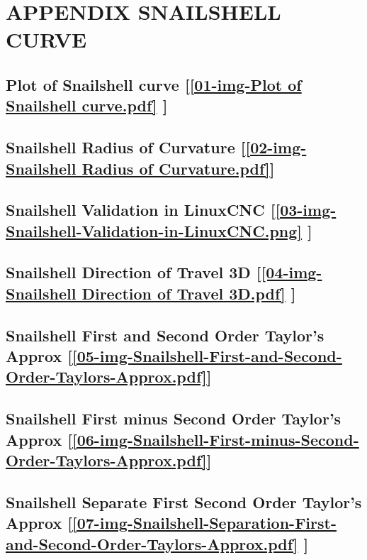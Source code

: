 \section{\textbf{APPENDIX SNAILSHELL CURVE}} \label{APPENDIX SNAILSHELL CURVE}


\subsection       {Plot of Snailshell curve
	[\ref  {01-img-Plot of Snailshell curve.pdf} ] }
\label{ssec-01-img-Plot of Snailshell curve.pdf}

\subsection       {Snailshell Radius of Curvature
	[\ref      {02-img-Snailshell Radius of Curvature.pdf}] }
\label{ssec-02-img-Snailshell Radius of Curvature.pdf}

\subsection       {Snailshell Validation in LinuxCNC
	[\ref      {03-img-Snailshell-Validation-in-LinuxCNC.png} ] }
\label{ssec-03-img-Snailshell-Validation-in-LinuxCNC.png}

\subsection     {Snailshell Direction of Travel 3D
	[\ref      {04-img-Snailshell Direction of Travel 3D.pdf} ] }
\label{ssec-04-img-Snailshell Direction of Travel 3D.pdf}

\subsection       {Snailshell First and Second Order Taylor's Approx
	[\ref      {05-img-Snailshell-First-and-Second-Order-Taylors-Approx.pdf}] }
\label{ssec-05-img-Snailshell-First-and-Second-Order-Taylors-Approx.pdf}

\subsection       {Snailshell First minus Second Order Taylor's Approx
	[\ref      {06-img-Snailshell-First-minus-Second-Order-Taylors-Approx.pdf}] }
\label{ssec-06-img-Snailshell-First-minus-Second-Order-Taylors-Approx.pdf}

\subsection       {Snailshell Separate First Second Order Taylor's Approx
	[\ref      {07-img-Snailshell-Separation-First-and-Second-Order-Taylors-Approx.pdf} ] }
\label{ssec-07-img-Snailshell-Separation-First-and-Second-Order-Taylors-Approx.pdf}

